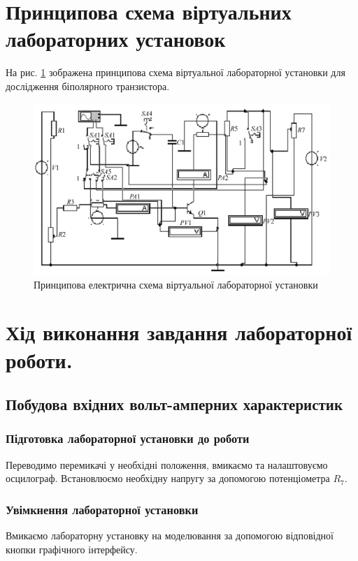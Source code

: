 \documentclass[a4paper,oneside,12pt,DIV=12,titlepage]{scrartcl}
\begin{document}
	\section{Принципова схема віртуальних лабораторних установок}
		На рис. \ref{fig:scheme} зображена принципова схема віртуальної лабораторної установки для дослідження біполярного транзистора.
		
		\begin{figure}[h!]
			\centering
			\includegraphics[width=\textwidth]{schematic-01.jpg}
			\caption{Принципова електрична схема віртуальної лабораторної установки}
			\label{fig:scheme}
		\end{figure}
		
	\section{Хід виконання завдання лабораторної роботи.}
		\subsection{Побудова вхідних вольт-амперних характеристик}
			\subsubsection{Підготовка лабораторної установки до роботи}
				Переводимо перемикачі у необхідні положення, вмикаємо та налаштовуємо осцилограф. Встановлюємо необхідну напругу за допомогою потенціометра $R_7$.
			
			\subsubsection{Увімкнення лабораторної установки}
				Вмикаємо лабораторну установку на моделювання за допомогою відповідної кнопки графічного інтерфейсу.
				
\end{document}
